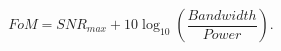 \begin{equation}\label{eq:FoM}
    \mathit{FoM} = \mathit{SNR}_{\mathit{max}}+10\log_{10}\left({\frac{\mathit{Bandwidth}}{\mathit{Power}}}\right).
\end{equation}

